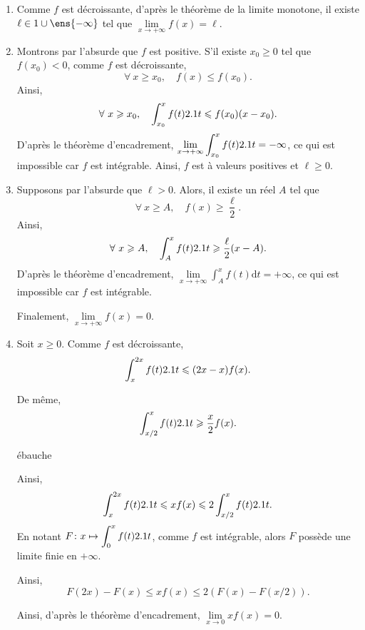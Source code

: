 \begin{elemsolution}
\begin{enumerate}
\item Comme $f$ est décroissante, d'après le théorème de la limite monotone, il existe $\ell \in \R \cup \ens{-\infty}$ tel que $\lim\limits_{x\to+\infty} f(x) = \ell$.

\item Montrons par l'absurde que $f$ est positive. S'il existe $x_0 \geqslant 0$ tel que $f(x_0) < 0$, comme $f$ est décroissante,
\[
\forall\ x \geqslant x_0,\quad f(x) \leq f(x_0).
\]
Ainsi,
\[
\forall\ x \geqslant x_0,\quad \displaystyle\int_{x_0}^x f(t) \d t \leqslant f(x_0) (x - x_0).
\]
D'après le théorème d'encadrement, $\lim\limits_{x\to+\infty} \displaystyle\int_{x_0}^x f(t) \d t = -\infty$, ce qui est impossible car $f$ est intégrable. Ainsi, $f$ est à valeurs positives et $\ell \geqslant 0$.

\item Supposons par l'absurde que $\ell > 0$. Alors, il existe un réel $A$ tel que
\[
\forall\ x \geqslant A,\quad f(x) \geqslant \frac{\ell}{2}.
\]
Ainsi,
\[
\forall\ x \geqslant A,\quad \displaystyle\int_A^x f(t) \d t \geqslant \frac{\ell}{2} (x - A).
\]
D'après le théorème d'encadrement, $\lim\limits_{x\to+\infty} \displaystyle\int_A^x f(t) \mathrm{d}t = +\infty$, ce qui est impossible car $f$ est intégrable.

Finalement, $\lim\limits_{x\to+\infty} f(x) = 0$.

\item Soit $x \geqslant 0$. Comme $f$ est décroissante,
\[
\int_x^{2 x} f(t) \d t \leqslant (2 x - x) f(x).
\]

De même,
\[
\int_{x/2}^x f(t) \d t \geqslant \frac{x}{2} f(x).
\]

\begin{marginfigure}
    \centering
    
    \caption{ébauche}
\end{marginfigure}


Ainsi,
\[
\int_x^{2 x} f(t) \d t \leqslant x f(x) \leqslant 2 \int_{x/2}^x f(t) \d t.
\]
En notant $\fonctionligne[F]{x}{\displaystyle\int_0^x f(t) \d t}$, comme $f$ est intégrable, alors $F$ possède une limite finie en $+\infty$.

Ainsi,
\[
F(2 x) - F(x) \leqslant x f(x) \leqslant 2 (F(x) - F(x/2)).
\]

Ainsi, d'après le théorème d'encadrement, $\lim\limits_{x\to 0} x f(x) = 0$.
\end{enumerate}
\end{elemsolution}

